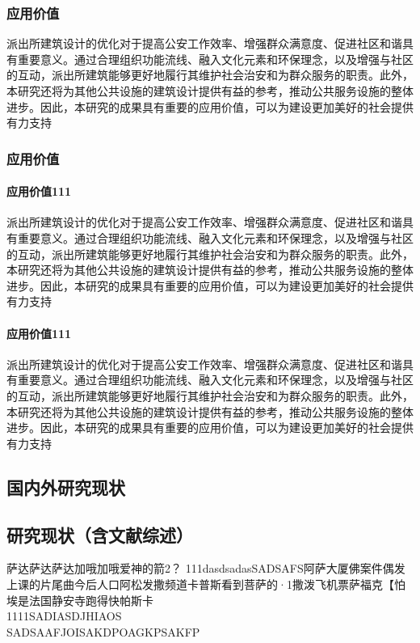 \documentclass[AutoFakeBold]{ZafuResearchProposal}
\begin{document}
\begin{RPSectionBox}
    \subsubsection{应用价值}
    派出所建筑设计的优化对于提高公安工作效率、增强群众满意度、促进社区和谐具有重要意义。通过合理组织功能流线、融入文化元素和环保理念，以及增强与社区的互动，派出所建筑能够更好地履行其维护社会治安和为群众服务的职责。此外，本研究还将为其他公共设施的建筑设计提供有益的参考，推动公共服务设施的整体进步。因此，本研究的成果具有重要的应用价值，可以为建设更加美好的社会提供有力支持
    
    \subsubsection{应用价值}
    \paragraph{应用价值111}
    派出所建筑设计的优化对于提高公安工作效率、增强群众满意度、促进社区和谐具有重要意义。通过合理组织功能流线、融入文化元素和环保理念，以及增强与社区的互动，派出所建筑能够更好地履行其维护社会治安和为群众服务的职责。此外，本研究还将为其他公共设施的建筑设计提供有益的参考，推动公共服务设施的整体进步。因此，本研究的成果具有重要的应用价值，可以为建设更加美好的社会提供有力支持
    \paragraph{应用价值111}
    派出所建筑设计的优化对于提高公安工作效率、增强群众满意度、促进社区和谐具有重要意义。通过合理组织功能流线、融入文化元素和环保理念，以及增强与社区的互动，派出所建筑能够更好地履行其维护社会治安和为群众服务的职责。此外，本研究还将为其他公共设施的建筑设计提供有益的参考，推动公共服务设施的整体进步。因此，本研究的成果具有重要的应用价值，可以为建设更加美好的社会提供有力支持
\end{RPSectionBox}

\begin{RPSectionBox}
    \section{国内外研究现状}
    \subsection{研究现状（含文献综述）}
    
    萨达萨达萨达加哦加哦爱神的箭2？
    111dasdsadasSADSAFS阿萨大厦佛案件偶发上课的片尾曲今后人口阿松发撒频道卡普斯看到菩萨的·1撒泼飞机票萨福克【怕埃是法国静安寺跑得快帕斯卡\\
    1111SADIASDJHIAOS\\
    SADSAAFJOISAKDPOAGKPSAKFP
\end{RPSectionBox}
\end{document}

